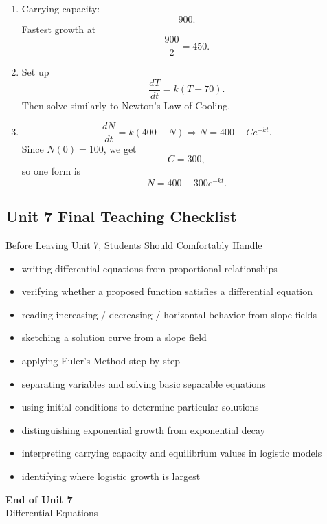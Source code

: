 \documentclass[11pt]{article}
\begin{document}
\begin{enumerate}
    \item Carrying capacity:
    \[
    900.
    \]
    Fastest growth at
    \[
    \frac{900}{2}=450.
    \]

    \item Set up
    \[
    \frac{dT}{dt}=k(T-70).
    \]
    Then solve similarly to Newton’s Law of Cooling.

    \item
    \[
    \frac{dN}{dt}=k(400-N)
    \Rightarrow
    N=400-Ce^{-kt}.
    \]
    Since \(N(0)=100\), we get
    \[
    C=300,
    \]
    so one form is
    \[
    N=400-300e^{-kt}.
    \]
\end{enumerate}

\newpage
\subsection{Unit 7 Final Teaching Checklist}

\begin{theorybox}{Before Leaving Unit 7, Students Should Comfortably Handle}
\begin{itemize}
    \item writing differential equations from proportional relationships
    \item verifying whether a proposed function satisfies a differential equation
    \item reading increasing / decreasing / horizontal behavior from slope fields
    \item sketching a solution curve from a slope field
    \item applying Euler’s Method step by step
    \item separating variables and solving basic separable equations
    \item using initial conditions to determine particular solutions
    \item distinguishing exponential growth from exponential decay
    \item interpreting carrying capacity and equilibrium values in logistic models
    \item identifying where logistic growth is largest
\end{itemize}
\end{theorybox}

\vfill
\begin{center}
{\Large\color{novelPurpleDark}\textbf{End of Unit 7}}\\[0.35em]
{\large Differential Equations}
\end{center}
\end{document}
